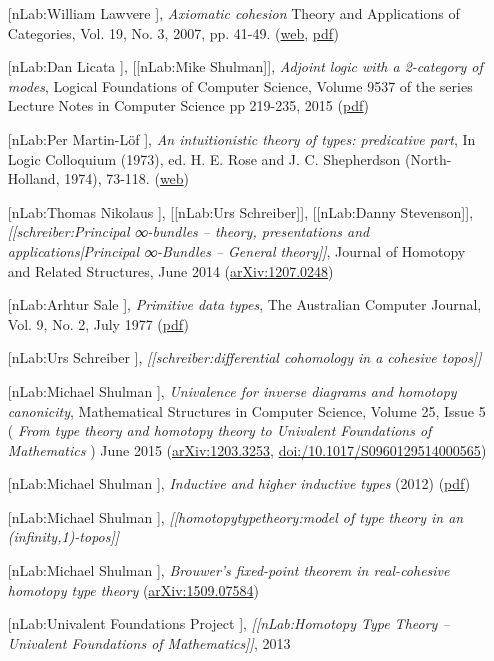\documentclass[12pt,titlepage]{article}
\theoremstyle{plain}
\theoremstyle{definition}
\theoremstyle{remark}
\begin{document}
\begin{itemize}
\item [[nLab:William Lawvere]], \emph{Axiomatic cohesion} Theory and Applications of Categories, Vol. 19, No. 3, 2007, pp. 41-49. (\href{http://www.tac.mta.ca/tac/volumes/19/3/19-03abs.html}{web}, \href{http://www.tac.mta.ca/tac/volumes/19/3/19-03.pdf}{pdf})


\item [[nLab:Dan Licata]], [[nLab:Mike Shulman]], \emph{Adjoint logic with a 2-category of modes}, Logical Foundations of Computer Science, Volume 9537 of the series Lecture Notes in Computer Science pp 219-235, 2015 (\href{http://dlicata.web.wesleyan.edu/pubs/ls15adjoint/ls15adjoint.pdf}{pdf})


\item [[nLab:Per Martin-Löf]], \emph{An intuitionistic theory of types: predicative part}, In Logic Colloquium (1973), ed. H. E. Rose and J. C. Shepherdson (North-Holland, 1974), 73-118. (\href{http://citeseerx.ist.psu.edu/viewdoc/summary?doi=10.1.1.131.926}{web})


\item [[nLab:Thomas Nikolaus]], [[nLab:Urs Schreiber]], [[nLab:Danny Stevenson]], \emph{[[schreiber:Principal ∞-bundles -- theory, presentations and applications|Principal ∞-Bundles -- General theory]]}, Journal of Homotopy and Related Structures, June 2014 (\href{http://arxiv.org/abs/1207.0248}{arXiv:1207.0248})


\item [[nLab:Arhtur Sale]], \emph{Primitive data types}, The Australian Computer Journal, Vol. 9, No. 2, July 1977 (\href{http://eprints.utas.edu.au/139/1/PrimitiveData.pdf}{pdf})


\item [[nLab:Urs Schreiber]], \emph{[[schreiber:differential cohomology in a cohesive topos]]}


\item [[nLab:Michael Shulman]], \emph{Univalence for inverse diagrams and homotopy canonicity}, Mathematical Structures in Computer Science, Volume 25, Issue 5 ( \emph{From type theory and homotopy theory to Univalent Foundations of Mathematics} ) June 2015 (\href{https://arxiv.org/abs/1203.3253}{arXiv:1203.3253}, \href{https://doi.org/10.1017/S0960129514000565}{doi:/10.1017/S0960129514000565})


\item [[nLab:Michael Shulman]], \emph{Inductive and higher inductive types} (2012) (\href{http://www.math.ias.edu/~mshulman/hottminicourse2012/04induction.pdf}{pdf})


\item [[nLab:Michael Shulman]], \emph{[[homotopytypetheory:model of type theory in an (infinity,1)-topos]]}


\item [[nLab:Michael Shulman]], \emph{Brouwer's fixed-point theorem in real-cohesive homotopy type theory} (\href{http://arxiv.org/abs/1509.07584}{arXiv:1509.07584})


\item [[nLab:Univalent Foundations Project]], \emph{[[nLab:Homotopy Type Theory -- Univalent Foundations of Mathematics]]}, 2013



\end{itemize}
\end{document}
